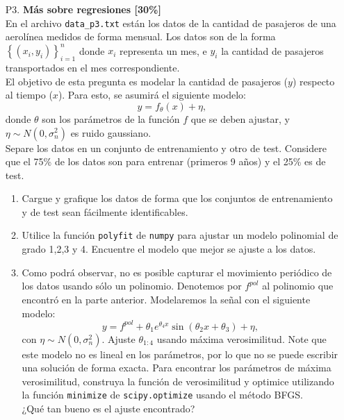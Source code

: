 \documentclass[letterpaper,11pt]{article}
\theoremstyle{plain}
\theoremstyle{definition}
\newcommand{\1}{\mathbbm{1}}
\begin{document}
\begin{enumerate}
\begin{enumerate}
\end{enumerate}


\item [P3.] \textbf{Más sobre regresiones [30\%]}\\

En el archivo \texttt{data\_p3.txt} están los datos de la cantidad de pasajeros de una aerolínea medidos de forma mensual. Los datos son de la forma $\left \{(x_i,y_i)\right \}_{i=1}^{n}$ donde $x_i$ representa un mes, e $y_i$ la cantidad de pasajeros transportados en el mes correspondiente.\\

El objetivo de esta pregunta es modelar la cantidad de pasajeros ($y$) respecto al tiempo ($x$). Para esto, se asumirá el siguiente modelo: 
$$
y = f_{\theta}(x) + \eta,
$$
donde $\theta$ son los parámetros de la función $f$ que se deben ajustar, y $\eta \sim N(0, \sigma_n^2) $ es ruido gaussiano. \\

Separe los datos en un conjunto de entrenamiento y otro de test. Considere que el 75\% de los datos son para entrenar (primeros 9 años) y el 25\% es de test. 
\begin{enumerate}
    \item  Cargue y grafique los datos de forma que  los conjuntos de entrenamiento y de test sean fácilmente identificables.
    \item Utilice la función \texttt{polyfit} de \texttt{numpy} para ajustar un modelo polinomial de grado 1,2,3 y 4. Encuentre el modelo que mejor se ajuste a los datos.
    
    
    
    \item Como podrá observar, no es posible capturar el movimiento periódico de los datos usando sólo un polinomio. Denotemos por $f^{pol}$ al polinomio que encontró en la parte anterior. Modelaremos la señal con el siguiente modelo: 
    $$
    y = f^{pol} + \theta_1  e^{\theta_4 x }  \sin (\theta_2 x + \theta_3) + \eta,
    $$
    con $\eta \sim N(0, \sigma_n^2) $. Ajuste $\theta_{1:4}$ usando máxima verosimilitud. Note que este modelo no es lineal en los parámetros, por lo que no se puede escribir una solución de forma exacta. Para encontrar los parámetros de máxima verosimilitud, construya la función de verosimilitud y optimice utilizando la función \texttt{minimize} de \texttt{scipy.optimize} usando el método BFGS. \\
    ¿Qué tan bueno es el ajuste encontrado?\\
    

\end{enumerate}
\end{enumerate}
\end{document}
